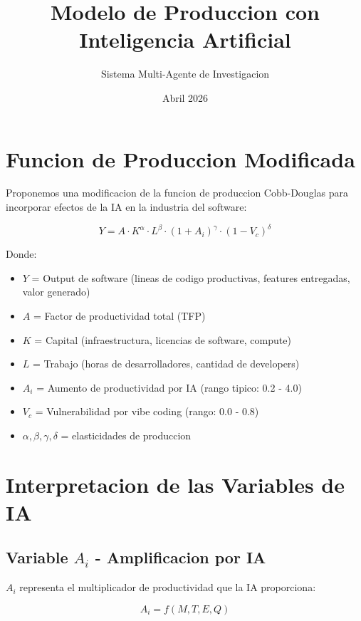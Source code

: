 \documentclass{article}
\title{Modelo de Produccion con Inteligencia Artificial}
\author{Sistema Multi-Agente de Investigacion}
\date{Abril 2026}
\begin{document}
\maketitle

\section{Funcion de Produccion Modificada}

Proponemos una modificacion de la funcion de produccion Cobb-Douglas para incorporar efectos de la IA en la industria del software:

\begin{equation}
Y = A \cdot K^{\alpha} \cdot L^{\beta} \cdot (1 + A_i)^{\gamma} \cdot (1 - V_c)^{\delta}
\end{equation}

Donde:
\begin{itemize}
    \item $Y$ = Output de software (lineas de codigo productivas, features entregadas, valor generado)
    \item $A$ = Factor de productividad total (TFP)
    \item $K$ = Capital (infraestructura, licencias de software, compute)
    \item $L$ = Trabajo (horas de desarrolladores, cantidad de developers)
    \item $A_i$ = Aumento de productividad por IA (rango tipico: 0.2 - 4.0)
    \item $V_c$ = Vulnerabilidad por vibe coding (rango: 0.0 - 0.8)
    \item $\alpha, \beta, \gamma, \delta$ = elasticidades de produccion
\end{itemize}

\section{Interpretacion de las Variables de IA}

\subsection{Variable $A_i$ - Amplificacion por IA}

$A_i$ representa el multiplicador de productividad que la IA proporciona:

\begin{equation}
A_i = f(M, T, E, Q)
\end{equation}
\end{document}
